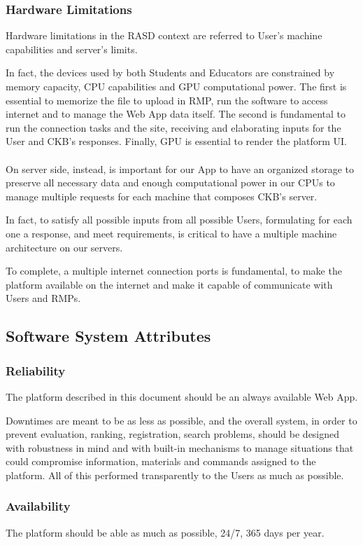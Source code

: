 \subsubsection{Hardware Limitations}
Hardware limitations in the RASD context are referred to User's machine capabilities and server's limits. 

In fact, the devices used by both Students and Educators are constrained by memory capacity, CPU capabilities and GPU computational power. The first is essential to memorize the file to upload in RMP, run the software to access internet
 and to manage the Web App data itself. The second is fundamental to run the connection tasks and the site, receiving and elaborating inputs for the User and CKB's responses. Finally, GPU is essential to render the platform UI.\\
\\
 On server side, instead, is important for our App to have an organized storage to preserve all necessary data and enough computational power in our CPUs to manage multiple requests for each machine that composes CKB's server. 
 
In fact, to satisfy all possible inputs from all possible Users, formulating for each one a response, and meet requirements, is critical to have a multiple machine architecture on our servers. 

To complete, a multiple internet connection ports is fundamental, to make the platform available on the internet and make it capable of communicate with Users and RMPs.

\subsection{Software System Attributes}

\subsubsection{Reliability}
The platform described in this document should be an always available Web App. 

Downtimes are meant to be as less as possible, and the overall system, in order to prevent evaluation, ranking, registration, search problems, should be designed with robustness in mind and with built-in mechanisms to manage situations 
that could compromise information, materials and commands assigned to the platform. All of this performed transparently to the Users as much as possible.

\subsubsection{Availability}
The platform should be able as much as possible, 24/7, 365 days per year. 

